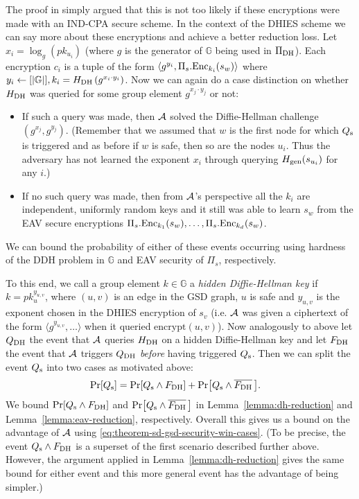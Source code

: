 
The proof in \cite{ttkem} simply argued that this is not too likely if these encryptions were made with an IND-CPA secure scheme. In the context of the DHIES scheme we can say more about these encryptions and achieve a better reduction loss.
Let $x_i = \log_g(pk_{u_i})$ (where $g$ is the generator of $\mathbb{G}$ being used in $\Pi_{\mathrm{DH}}$). Each encryption $c_i$ is a tuple of the form $\langle g^{y_i}, \Pi_s.\mathrm{Enc}_{k_i}(s_w) \rangle$ where $y_i \leftarrow [\lvert\mathbb{G}\rvert], k_i = H_\mathrm{DH}\left(g^{x_i \cdot y_i}\right)$. Now we can again do a case distinction on whether $H_\mathrm{DH}$ was queried for some group element $g^{x_j \cdot y_j}$ or not:
\begin{itemize}
	\item If such a query was made, then $\mathcal{A}$ solved the Diffie-Hellman challenge $(g^{x_j}, g^{y_j})$. (Remember that we assumed that $w$ is the first node for which $Q_\mathrm{s}$ is triggered and as before if $w$ is safe, then so are the nodes $u_i$. Thus the adversary has not learned the exponent $x_i$ through querying $H_\mathrm{gen}(s_{u_i})$ for any $i$.)
	\item If no such query was made, then from $\mathcal{A}$'s perspective all the $k_i$ are independent, uniformly random keys and it still was able to learn $s_w$ from the EAV secure encryptions $\Pi_s.\mathrm{Enc}_{k_1}(s_w), \ldots, \Pi_s.\mathrm{Enc}_{k_d}(s_w)$.
\end{itemize}
We can bound the probability of either of these events occurring using hardness of the DDH problem in $\mathbb{G}$ and EAV security of $\Pi_s$, respectively.

To this end, we call a group element $k \in \mathbb{G}$ a \emph{hidden Diffie-Hellman key} if $k = pk_u^{y_{u, v}}$, where $(u, v)$ is an edge in the GSD graph, $u$ is safe and $y_{u, v}$ is the exponent chosen in the DHIES encryption of $s_v$ (i.e. $\mathcal{A}$ was given a ciphertext of the form $\langle g^{y_{u, v}}, \ldots\rangle$ when it queried $\mathrm{encrypt}(u, v)$). Now analogously to above let $Q_\mathrm{DH}$ the event that $\mathcal{A}$ queries $H_\mathrm{DH}$ on a hidden Diffie-Hellman key and let $F_\mathrm{DH}$ the event that $\mathcal{A}$ triggers $Q_\mathrm{DH}$ \emph{before} having triggered $Q_\mathrm{s}$. Then we can split the event $Q_\mathrm{s}$ into two cases as motivated above:
\begin{align*}
	\pr{\qs} & = \pr{\qs \land \fdh} + \pr{\qs \land \overline{\fdh}\,}.
\end{align*}
We bound $\pr{\qs \land \fdh}$ and $\pr{\qs \land \overline{\fdh} \,}$ in Lemma~\ref{lemma:dh-reduction} and Lemma~\ref{lemma:eav-reduction}, respectively. Overall this gives us a bound on the advantage of $\mathcal{A}$ using \eqref{eq:theorem-sd-gsd-security-win-cases}. (To be precise, the event $Q_\mathrm{s} \land F_\mathrm{DH}$ is a superset of the first scenario described further above. However, the argument applied in Lemma~\ref{lemma:dh-reduction} gives the same bound for either event and this more general event has the advantage of being simpler.)

